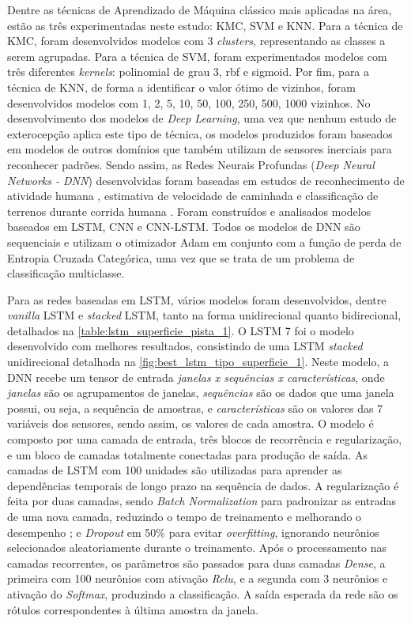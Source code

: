 Dentre as técnicas de Aprendizado de Máquina clássico mais aplicadas na área, estão as três experimentadas neste estudo: KMC, SVM e KNN. Para a técnica de KMC, foram desenvolvidos modelos com 3 \textit{clusters}, representando as classes a serem agrupadas. Para a técnica de SVM, foram experimentados modelos com três diferentes \textit{kernels}: polinomial de grau 3, rbf e sigmoid. Por fim, para a técnica de KNN, de forma a identificar o valor ótimo de vizinhos, foram desenvolvidos modelos com 1, 2, 5, 10, 50, 100, 250, 500, 1000 vizinhos. No desenvolvimento dos modelos de \textit{Deep Learning}, uma vez que nenhum estudo de exterocepção aplica este tipo de técnica, os modelos produzidos foram baseados em modelos de outros domínios que também utilizam de sensores inerciais para reconhecer padrões. Sendo assim, as Redes Neurais Profundas (\textit{Deep Neural Networks - DNN}) desenvolvidas foram baseadas em estudos de reconhecimento de atividade humana \cite{Deep2019,Alemayoh2019,Chen2015,Yang2018,Zebin2018,Zebin2019,Wang2019,Ahmad2019}, estimativa de velocidade de caminhada \cite{Shrestha2018} e classificação de terrenos durante corrida humana \cite{Dixon2019}. Foram construídos e analisados modelos baseados em LSTM, CNN e CNN-LSTM. Todos os modelos de DNN são sequenciais e utilizam o otimizador Adam em conjunto com a função de perda de Entropia Cruzada Categórica, uma vez que se trata de um problema de classificação multiclasse.

Para as redes baseadas em LSTM, vários modelos foram desenvolvidos, dentre \textit{vanilla} LSTM e \textit{stacked} LSTM, tanto na forma unidirecional quanto bidirecional, detalhados na \autoref{table:lstm_superficie_pista_1}. O LSTM 7 foi o modelo desenvolvido com melhores resultados, consistindo de uma LSTM \textit{stacked} unidirecional detalhada na \autoref{fig:best_lstm_tipo_superficie_1}. Neste modelo, a DNN recebe um tensor de entrada \emph{janelas x sequências x características}, onde \emph{janelas} são os agrupamentos de janelas, \emph{sequências} são os dados que uma janela possui, ou seja, a sequência de amostras, e \emph{características} são os valores das 7 variáveis dos sensores, sendo assim, os valores de cada amostra. O modelo é composto por uma camada de entrada, três blocos de recorrência e regularização, e um bloco de camadas totalmente conectadas para produção de saída. As camadas de LSTM com 100 unidades são utilizadas para aprender as dependências temporais de longo prazo na sequência de dados. A regularização é feita por duas camadas, sendo \textit{Batch Normalization} para padronizar as entradas de uma nova camada, reduzindo o tempo de treinamento e melhorando o desempenho \cite{Zebin2018}; e \textit{Dropout} em 50\% para evitar \textit{overfitting}, ignorando neurônios selecionados aleatoriamente durante o treinamento. Após o processamento nas camadas recorrentes, os parâmetros são passados para duas camadas \textit{Dense}, a primeira com 100 neurônios com ativação \textit{Relu}, e a segunda com 3 neurônios e ativação do \textit{Softmax}, produzindo a classificação. A saída esperada da rede são os rótulos correspondentes à última amostra da janela.

